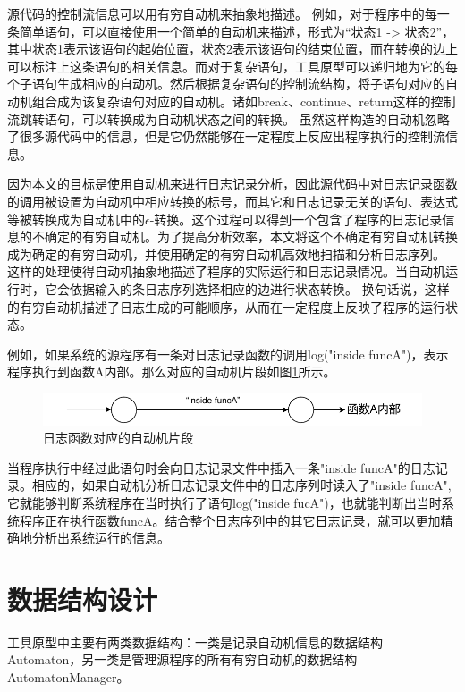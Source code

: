 源代码的控制流信息可以用有穷自动机来抽象地描述。
例如，对于程序中的每一条简单语句，可以直接使用一个简单的自动机来描述，形式为“状态1 -> 状态2”，其中状态1表示该语句的起始位置，状态2表示该语句的结束位置，而在转换的边上可以标注上这条语句的相关信息。而对于复杂语句，工具原型可以递归地为它的每个子语句生成相应的自动机。然后根据复杂语句的控制流结构，将子语句对应的自动机组合成为该复杂语句对应的自动机。诸如break、continue、return这样的控制流跳转语句，可以转换成为自动机状态之间的转换。
虽然这样构造的自动机忽略了很多源代码中的信息，但是它仍然能够在一定程度上反应出程序执行的控制流信息。

因为本文的目标是使用自动机来进行日志记录分析，因此源代码中对日志记录函数的调用被设置为自动机中相应转换的标号，而其它和日志记录无关的语句、表达式等被转换成为自动机中的$\epsilon$-转换。这个过程可以得到一个包含了程序的日志记录信息的不确定的有穷自动机。为了提高分析效率，本文将这个不确定有穷自动机转换成为确定的有穷自动机，并使用确定的有穷自动机高效地扫描和分析日志序列。
这样的处理使得自动机抽象地描述了程序的实际运行和日志记录情况。当自动机运行时，它会依据输入的条日志序列选择相应的边进行状态转换。
换句话说，这样的有穷自动机描述了日志生成的可能顺序，从而在一定程度上反映了程序的运行状态。

例如，如果系统的源程序有一条对日志记录函数的调用log("inside funcA")，表示程序执行到函数A内部。那么对应的自动机片段如图\ref{fig:日志函数对应的自动机片段}所示。

\begin{figure}[htbp]
	\centering
	\includegraphics[width=1\textwidth]{pictures/函数调用示例.pdf}
	\caption{日志函数对应的自动机片段}
	\label{fig:日志函数对应的自动机片段}
\end{figure}
当程序执行中经过此语句时会向日志记录文件中插入一条"inside funcA"的日志记录。相应的，如果自动机分析日志记录文件中的日志序列时读入了"inside funcA", 它就能够判断系统程序在当时执行了语句log("inside fucA")，也就能判断出当时系统程序正在执行函数funcA。结合整个日志序列中的其它日志记录，就可以更加精确地分析出系统运行的信息。


\section{数据结构设计}
工具原型中主要有两类数据结构：一类是记录自动机信息的数据结构 Automaton，另一类是管理源程序的所有有穷自动机的数据结构 AutomatonManager。


